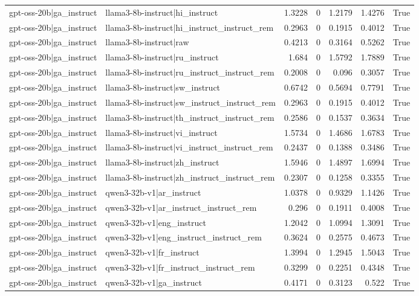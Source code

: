 \begin{table}
\begin{tabular}{l l r r r r l}
gpt-oss-20b|ga_instruct & llama3-8b-instruct|hi_instruct & 1.3228 & 0 & 1.2179 & 1.4276 & True \\
gpt-oss-20b|ga_instruct & llama3-8b-instruct|hi_instruct_instruct_rem & 0.2963 & 0 & 0.1915 & 0.4012 & True \\
gpt-oss-20b|ga_instruct & llama3-8b-instruct|raw & 0.4213 & 0 & 0.3164 & 0.5262 & True \\
gpt-oss-20b|ga_instruct & llama3-8b-instruct|ru_instruct & 1.684 & 0 & 1.5792 & 1.7889 & True \\
gpt-oss-20b|ga_instruct & llama3-8b-instruct|ru_instruct_instruct_rem & 0.2008 & 0 & 0.096 & 0.3057 & True \\
gpt-oss-20b|ga_instruct & llama3-8b-instruct|sw_instruct & 0.6742 & 0 & 0.5694 & 0.7791 & True \\
gpt-oss-20b|ga_instruct & llama3-8b-instruct|sw_instruct_instruct_rem & 0.2963 & 0 & 0.1915 & 0.4012 & True \\
gpt-oss-20b|ga_instruct & llama3-8b-instruct|th_instruct_instruct_rem & 0.2586 & 0 & 0.1537 & 0.3634 & True \\
gpt-oss-20b|ga_instruct & llama3-8b-instruct|vi_instruct & 1.5734 & 0 & 1.4686 & 1.6783 & True \\
gpt-oss-20b|ga_instruct & llama3-8b-instruct|vi_instruct_instruct_rem & 0.2437 & 0 & 0.1388 & 0.3486 & True \\
gpt-oss-20b|ga_instruct & llama3-8b-instruct|zh_instruct & 1.5946 & 0 & 1.4897 & 1.6994 & True \\
gpt-oss-20b|ga_instruct & llama3-8b-instruct|zh_instruct_instruct_rem & 0.2307 & 0 & 0.1258 & 0.3355 & True \\
gpt-oss-20b|ga_instruct & qwen3-32b-v1|ar_instruct & 1.0378 & 0 & 0.9329 & 1.1426 & True \\
gpt-oss-20b|ga_instruct & qwen3-32b-v1|ar_instruct_instruct_rem & 0.296 & 0 & 0.1911 & 0.4008 & True \\
gpt-oss-20b|ga_instruct & qwen3-32b-v1|eng_instruct & 1.2042 & 0 & 1.0994 & 1.3091 & True \\
gpt-oss-20b|ga_instruct & qwen3-32b-v1|eng_instruct_instruct_rem & 0.3624 & 0 & 0.2575 & 0.4673 & True \\
gpt-oss-20b|ga_instruct & qwen3-32b-v1|fr_instruct & 1.3994 & 0 & 1.2945 & 1.5043 & True \\
gpt-oss-20b|ga_instruct & qwen3-32b-v1|fr_instruct_instruct_rem & 0.3299 & 0 & 0.2251 & 0.4348 & True \\
gpt-oss-20b|ga_instruct & qwen3-32b-v1|ga_instruct & 0.4171 & 0 & 0.3123 & 0.522 & True \\

\end{tabular}
\end{table}
